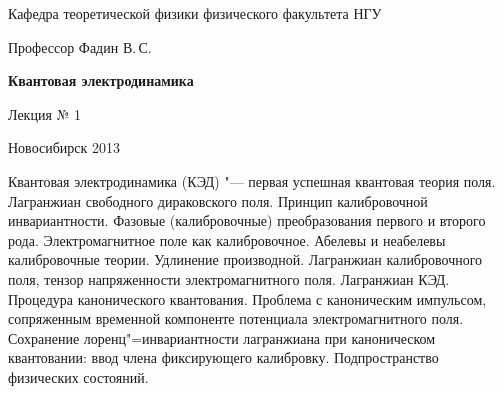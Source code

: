 \documentclass[12pt,pagesize,paper=192mm:108mm]{scrbook}
\begin{document}
\begin{titlepage}
\begin{center}
    Кафедра теоретической физики физического факультета НГУ
    \medskip

    \Large
    Профессор Фадин В.\,С.
    \bigskip

    \huge
    \textbf{Квантовая электродинамика}
    \bigskip

    \Large
    Лекция № 1
    \vfill

    \normalsize
    \vfill

    \normalsize \ccbysa\hspace{0.5em}  Новосибирск 2013
  \end{center}
\end{titlepage}
\newpage

\vspace*{-1em}
\begin{center}
\vfill
  \begin{minipage}{0.65\linewidth}
    Квантовая электродинамика (КЭД) "--- первая успешная квантовая
    теория поля. Лагранжиан свободного дираковского поля. Принцип
    калибровочной инвариантности. Фазовые (калибровочные)
    преобразования первого и второго рода. Электромагнитное поле как
    калибровочное. Абелевы и неабелевы калибровочные теории. Удлинение
    производной.  Лагранжиан калибровочного поля, тензор напряженности
    электромагнитного поля.  Лагранжиан КЭД. Процедура канонического
    квантования. Проблема с каноническим импульсом, сопряженным
    временной компоненте потенциала электромагнитного поля.
    Сохранение лоренц"=инвариантности лагранжиана при каноническом
    квантовании: ввод члена фиксирующего калибровку. Подпространство
    физических состояний.
  \end{minipage}
  \vfill

\end{center}
\end{document}
